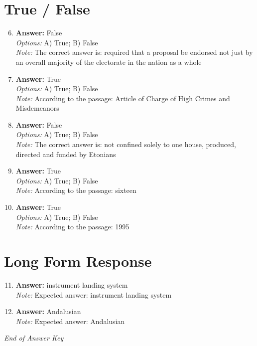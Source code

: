 \documentclass[12pt]{article}
\begin{document}
\section*{True / False}
\begin{enumerate}[label=\arabic*.]
\setcounter{enumi}{5}
\item \textbf{Answer:} False
\\ \textit{Options:} A) True; B) False
\\ \textit{Note:} The correct answer is: required that a proposal be endorsed not just by an overall majority of the electorate in the nation as a whole
\item \textbf{Answer:} True
\\ \textit{Options:} A) True; B) False
\\ \textit{Note:} According to the passage: Article of Charge of High Crimes and Misdemeanors
\item \textbf{Answer:} False
\\ \textit{Options:} A) True; B) False
\\ \textit{Note:} The correct answer is: not confined solely to one house, produced, directed and funded by Etonians
\item \textbf{Answer:} True
\\ \textit{Options:} A) True; B) False
\\ \textit{Note:} According to the passage: sixteen
\item \textbf{Answer:} True
\\ \textit{Options:} A) True; B) False
\\ \textit{Note:} According to the passage: 1995
\end{enumerate}

\section*{Long Form Response}
\begin{enumerate}[label=\arabic*.]
\setcounter{enumi}{10}
\item \textbf{Answer:} instrument landing system
\\ \textit{Note:} Expected answer: instrument landing system
\item \textbf{Answer:} Andalusian
\\ \textit{Note:} Expected answer: Andalusian
\end{enumerate}

\vfill
\noindent\textit{End of Answer Key}
\end{document}
